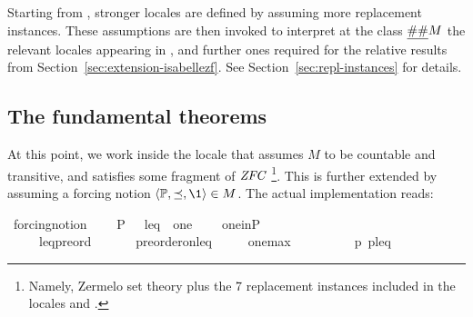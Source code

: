 Starting from , stronger locales are
defined by assuming more replacement instances.
These assumptions are then invoked to interpret at the class
$\isa{\#\#} M$ the relevant locales appearing in
, and further ones required for the relative
results from Section~\ref{sec:extension-isabellezf}. See
Section~\ref{sec:repl-instances} for details.


\subsection{The fundamental theorems}\label{sec:fundamental-theorems}
At this point, we work inside the locale  that
assumes $M$ to be
countable and transitive, and satisfies some fragment of
$\mathit{ZFC}$%
\footnote{%
Namely, Zermelo set theory plus the 7 replacement instances included in
the locales  and .
}.
This is further extended by assuming a forcing notion
$\lb \PP, {\preceq} ,\1\rb \in M$. The actual implementation reads:

\begin{isabelle}
\isamarkupfalse%
\ forcing{\isacharunderscore}{\kern0pt}notion\ {\isacharequal}{\kern0pt}\isanewline
\ \ \ P\ {\isacharparenleft}{\kern0pt}{\isacartoucheopen}{\isasymbbbP}{\isacartoucheclose}{\isacharparenright}{\kern0pt}\ \ leq\ \ one\ {\isacharparenleft}{\kern0pt}{\isacartoucheopen}{\isasymone}{\isacartoucheclose}{\isacharparenright}{\kern0pt}\isanewline
\ \ \ one{\isacharunderscore}{\kern0pt}in{\isacharunderscore}{\kern0pt}P{\isacharcolon}{\kern0pt}\ \ \ \ \ \ \ {\isachardoublequoteopen}{\isasymone}\ {\isasymin}\ {\isasymbbbP}{\isachardoublequoteclose}\isanewline
\ \ \ \ \ leq{\isacharunderscore}{\kern0pt}preord{\isacharcolon}{\kern0pt}\ \ \ \ \ \ \ {\isachardoublequoteopen}preorder{\isacharunderscore}{\kern0pt}on{\isacharparenleft}{\kern0pt}{\isasymbbbP}{\isacharcomma}{\kern0pt}leq{\isacharparenright}{\kern0pt}{\isachardoublequoteclose}\isanewline
\ \ \ \ \ one{\isacharunderscore}{\kern0pt}max{\isacharcolon}{\kern0pt}\ \ \ \ \ \ \ \ \ \ {\isachardoublequoteopen}{\isasymforall}p{\isasymin}{\isasymbbbP}{\isachardot}{\kern0pt}\ {\isasymlangle}p{\isacharcomma}{\kern0pt}{\isasymone}{\isasymrangle}{\isasymin}leq{\isachardoublequoteclose}
\end{isabelle}

